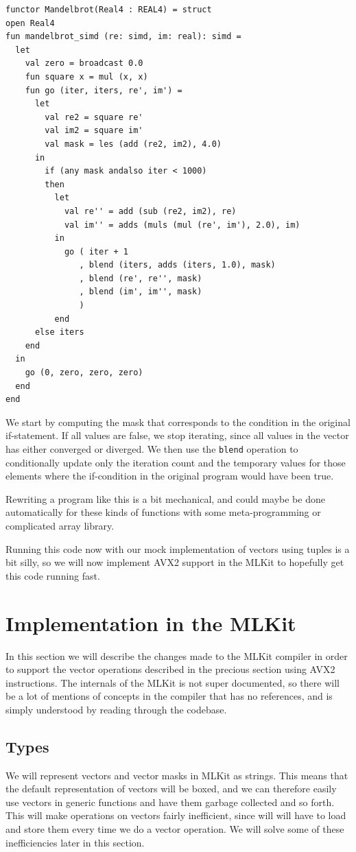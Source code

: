 \documentclass{article}
\begin{document}
\begin{lstlisting}[frame=single, label={lst:vector_mandel}, caption={Vector Mandelbrot}]
functor Mandelbrot(Real4 : REAL4) = struct
open Real4
fun mandelbrot_simd (re: simd, im: real): simd =
  let
    val zero = broadcast 0.0
    fun square x = mul (x, x)
    fun go (iter, iters, re', im') =
      let
        val re2 = square re'
        val im2 = square im'
        val mask = les (add (re2, im2), 4.0)
      in
        if (any mask andalso iter < 1000)
        then
          let 
            val re'' = add (sub (re2, im2), re)
            val im'' = adds (muls (mul (re', im'), 2.0), im)
          in
            go ( iter + 1
               , blend (iters, adds (iters, 1.0), mask)
               , blend (re', re'', mask)
               , blend (im', im'', mask)
               )
          end
      else iters
    end
  in
    go (0, zero, zero, zero)
  end
end
\end{lstlisting}
We start by computing the mask that corresponds to the condition in the original if-statement. If all values are false, we stop iterating, since all values in the vector has either converged or diverged. We then use the \verb!blend! operation to conditionally update only the iteration count and the temporary values for those elements where the if-condition in the original program would have been true.

Rewriting a program like this is a bit mechanical, and could maybe be done automatically for these kinds of functions with some meta-programming or complicated array library.

Running this code now with our mock implementation of vectors using tuples is a bit silly, so we will now implement AVX2 support in the MLKit to hopefully get this code running fast.

\section{Implementation in the MLKit}
In this section we will describe the changes made to the MLKit compiler in order to support the vector operations described in the precious section using AVX2 instructions. The internals of the MLKit is not super documented, so there will be a lot of mentions of concepts in the compiler that has no references, and is simply understood by reading through the codebase.

\subsection{Types}
We will represent vectors and vector masks in MLKit as strings. This means that the default representation of vectors will be boxed, and we can therefore easily use vectors in generic functions and have them garbage collected and so forth. This will make operations on vectors fairly inefficient, since will will have to load and store them every time we do a vector operation. We will solve some of these inefficiencies later in this section. 
\end{document}
